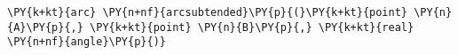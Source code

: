 \begin{Verbatim}[commandchars=\\\{\}]
    \PY{k+kt}{arc} \PY{n+nf}{arcsubtended}\PY{p}{(}\PY{k+kt}{point} \PY{n}{A}\PY{p}{,} \PY{k+kt}{point} \PY{n}{B}\PY{p}{,} \PY{k+kt}{real} \PY{n+nf}{angle}\PY{p}{)}
\end{Verbatim}
